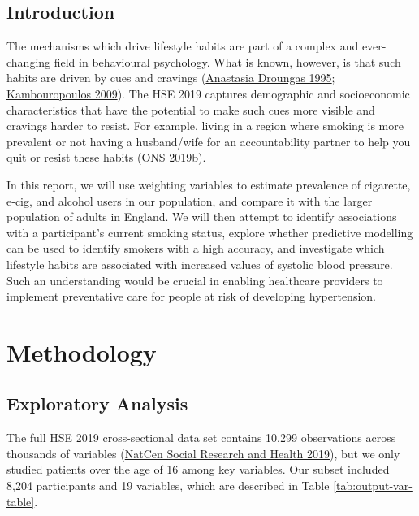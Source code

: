 \documentclass[
  11pt,
  twocolumn]{article}
\begin{document}
\hypertarget{introduction}{%
\subsection{Introduction}\label{introduction}}

The mechanisms which drive lifestyle habits are part of a complex and
ever-changing field in behavioural psychology. What is known, however,
is that such habits are driven by cues and cravings
(\protect\hyperlink{ref-SmokeCue}{Anastasia Droungas 1995};
\protect\hyperlink{ref-DrinkCue}{Kambouropoulos 2009}). The HSE 2019
captures demographic and socioeconomic characteristics that have the
potential to make such cues more visible and cravings harder to resist.
For example, living in a region where smoking is more prevalent or not
having a husband/wife for an accountability partner to help you quit or
resist these habits (\protect\hyperlink{ref-AccountPartner}{ONS 2019b}).

In this report, we will use weighting variables to estimate prevalence
of cigarette, e-cig, and alcohol users in our population, and compare it
with the larger population of adults in England. We will then attempt to
identify associations with a participant's current smoking status,
explore whether predictive modelling can be used to identify smokers
with a high accuracy, and investigate which lifestyle habits are
associated with increased values of systolic blood pressure. Such an
understanding would be crucial in enabling healthcare providers to
implement preventative care for people at risk of developing
hypertension.

\hypertarget{methodology}{%
\section{Methodology}\label{methodology}}

\hypertarget{exploratory-analysis}{%
\subsection{Exploratory Analysis}\label{exploratory-analysis}}

The full HSE 2019 cross-sectional data set contains 10,299 observations
across thousands of variables (\protect\hyperlink{ref-Main}{NatCen
Social Research and Health 2019}), but we only studied patients over the
age of 16 among key variables. Our subset included 8,204 participants
and 19 variables, which are described in Table
\ref{tab:output-var-table}.
\end{document}
